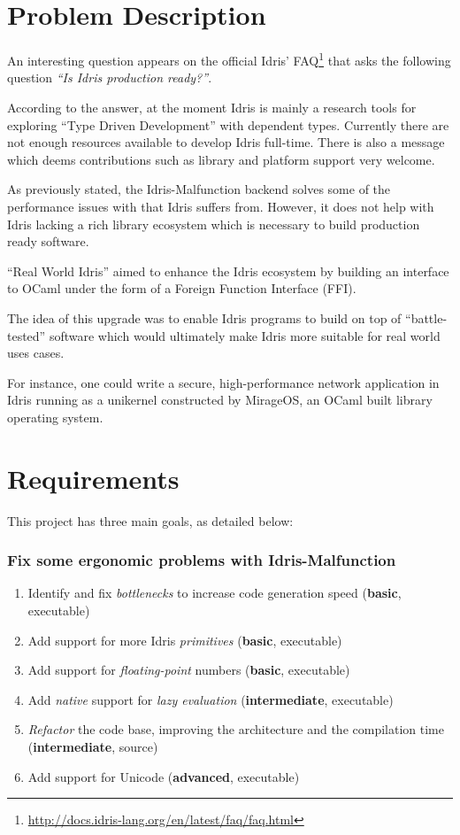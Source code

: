 \section{Problem Description}
An interesting question appears on the official Idris'
FAQ\footnote{\url{http://docs.idris-lang.org/en/latest/faq/faq.html}}
that asks the following question \emph{``Is Idris production ready?''}.

According to the answer, at the moment Idris is mainly a research tools
for exploring ``Type Driven Development'' \citep{tdd} with
dependent types.
Currently there are not enough resources available to develop Idris
full-time.
There is also a message which deems contributions such as library and
platform support very welcome.

As previously stated, the Idris-Malfunction backend solves some of the
performance issues with that Idris suffers from.
However, it does not help with Idris lacking a rich library ecosystem
which is necessary to build production ready software.

``Real World Idris'' aimed to enhance the Idris ecosystem by building an
interface to OCaml under the form of a Foreign Function Interface (FFI).

The idea of this upgrade was to enable Idris programs to build on top of
``battle-tested'' software which would ultimately make Idris more suitable
for real world uses cases.

For instance, one could write a secure, high-performance network application in Idris running as a unikernel constructed by MirageOS, an OCaml built library
operating system.


\section{Requirements}
This project has three main goals, as detailed below:

\subsubsection{Fix some ergonomic problems with Idris-Malfunction}
\begin{enumerate}
    \item Identify and fix \emph{bottlenecks} to increase code generation
          speed (\textbf{basic}, executable)
    \item Add support for more Idris
          \emph{primitives} (\textbf{basic}, executable)
    \item Add support for \emph{floating-point} numbers
          (\textbf{basic}, executable)
    \item Add \emph{native} support for \emph{lazy evaluation}
          (\textbf{intermediate}, executable)
    \item \emph{Refactor} the code base, improving the architecture and
          the compilation time (\textbf{intermediate}, source)
    \item Add support for Unicode (\textbf{advanced}, executable)
\end{enumerate}

